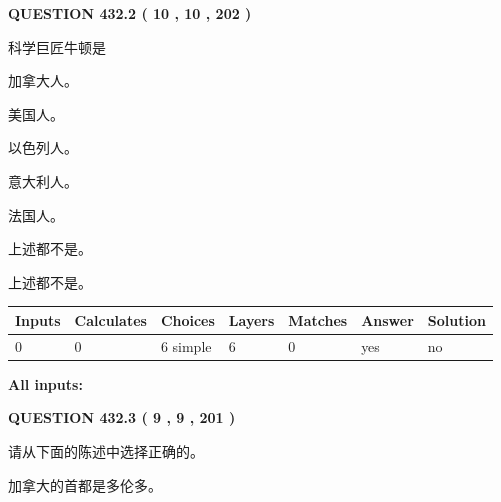 \documentclass{ctexart}
\begin{document}
   
  
\vspace{0.2in}
  
{\textbf{\Large{QUESTION
432.2 
 ( 10 , 10 , 202 )
}}}
  
  
科学巨匠牛顿是
 
 
加拿大人。
 
 
美国人。
 
 
以色列人。
 
 
意大利人。
 
 
法国人。
 
 
 上述都不是。
 
 
\noindent{}
 
 
 上述都不是。
 
 
\noindent{}
 
 
   
   
   
   
\noindent\begin{tabular}{|l|l|l|l|l|l|l|}
 \hline
Inputs & Calculates & Choices & Layers & Matches & Answer & Solution \\ \hline
 0  & 
 0  & 
 6
  simple  
  & 
 6  & 
 0  & 
  yes & 
  no 
  \\ \hline
 \end{tabular}
   
   
   
   
\noindent{}
   
   
   
   
\noindent\vspace{0.1in}\hspace{-0.08in} {\textbf{\Large{All inputs: }}}
   
   
  
\vspace{0.2in}
  
{\textbf{\Large{QUESTION
432.3 
 ( 9 , 9 , 201 )
}}}
  
  
请从下面的陈述中选择正确的。
 
 
加拿大的首都是多伦多。
 
\end{document}
